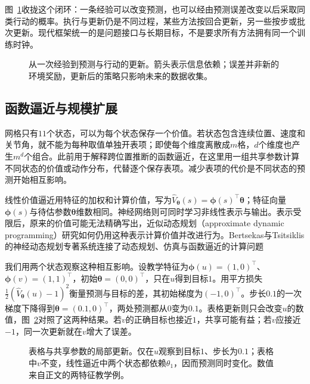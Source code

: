 图~\ref{fig:rl-overview-modern-loop}收拢这个闭环：一条经验可以改变预测，也可以经由预测误差改变以后采取同类行动的概率。执行与更新仍是不同过程，某些方法按回合更新，另一些按步或批次更新。现代框架统一的是问题接口与长期目标，不是要求所有方法拥有同一个训练时钟。

\begin{figure}[htbp]
  \centering
  
  \caption{从一次经验到预测与行动的更新。箭头表示信息依赖；误差并非新的环境奖励，更新后的策略只影响未来的数据收集。}
  \label{fig:rl-overview-modern-loop}
\end{figure}

\subsection{函数逼近与规模扩展}
\label{sec:rl-overview-approximation}

网格只有$11$个状态，可以为每个状态保存一个价值。若状态包含连续位置、速度和关节角，就不能为每种取值单独开表项；即使每个维度离散成$m$格，$d$个维度也产生$m^d$个组合。此前用于解释跨位置推断的函数逼近，在这里用一组共享参数计算不同状态的价值或动作分布，代替逐个保存表项。减少表项的代价是不同状态的预测开始相互影响。

线性价值逼近用特征的加权和计算价值，写为$\widehat V_{\bm\theta}(s)=\bm\phi(s)^\top\bm\theta$；特征向量$\bm\phi(s)$与待估参数$\bm\theta$维数相同。神经网络则可同时学习非线性表示与输出。表示受限后，原来的价值可能无法精确写出，近似动态规划（approximate dynamic programming）研究如何仍用这种表示计算价值并改进行为。Bertsekas与Tsitsiklis的神经动态规划专著系统连接了动态规划、仿真与函数逼近的计算问题

我们用两个状态观察这种相互影响。设教学特征为$\bm\phi(u)=(1,0)^\top$、$\bm\phi(v)=(1,1)^\top$，初始$\bm\theta=(0,0)^\top$，只在$u$得到目标$1$。用平方损失$\tfrac12(\widehat V_{\bm\theta}(u)-1)^2$衡量预测与目标的差，其初始梯度为$(-1,0)^\top$。步长$0.1$的一次梯度下降得到$\bm\theta=(0.1,0)^\top$，两处预测都从$0$变为$0.1$。表格更新则只会改变$u$的数值，图~\ref{fig:rl-overview-approximation}对照了这两种结果。若$v$的正确目标也接近$1$，共享可能有益；若$v$应接近$-1$，同一次更新就在$v$增大了误差。

\begin{figure}[htbp]
  \centering
  
  \caption{表格与共享参数的局部更新。仅在$u$观察到目标$1$、步长为$0.1$；表格中$v$不变，线性逼近中两个状态都依赖$\theta_1$，因而预测同时变化。数值来自正文的两特征教学例。}
  \label{fig:rl-overview-approximation}
\end{figure}

